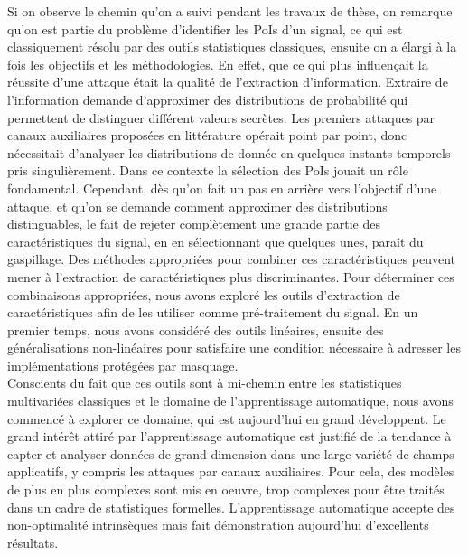 Si on observe le chemin qu'on a suivi pendant les travaux de th\`{e}se, on remarque qu'on est partie du probl\`{e}me d'identifier les PoIs d'un signal, ce qui est classiquement r\'{e}solu par des outils statistiques classiques, ensuite on a \'{e}largi \`{a} la fois les objectifs et les m\'{e}thodologies. En effet, que ce qui plus influençait la r\'{e}ussite d'une attaque \'{e}tait la qualit\'{e} de l'extraction d'information. Extraire de l'information demande d'approximer des distributions de probabilit\'{e} qui permettent de distinguer diff\'{e}rent valeurs secr\`{e}tes. Les premiers attaques par canaux auxiliaires propos\'{e}es en litt\'{e}rature op\'{e}rait point par point, donc n\'{e}cessitait d'analyser les distributions de donn\'{e}e en quelques instants temporels pris singuli\`{e}rement. Dans ce contexte la s\'{e}lection des PoIs jouait un r\^{o}le fondamental. Cependant, d\`{e}s qu'on fait un pas en arri\`{e}re vers l'objectif d'une attaque, et qu'on se demande comment approximer des distributions distinguables, le fait de rejeter compl\`{e}tement une grande partie des caract\'{e}ristiques du signal, en en s\'{e}lectionnant que quelques unes, paraît du gaspillage. Des m\'{e}thodes appropri\'{e}es pour combiner ces caract\'{e}ristiques peuvent mener \`{a} l'extraction de caract\'{e}ristiques plus discriminantes. Pour d\'{e}terminer ces combinaisons appropri\'{e}es, nous avons explor\'{e} les outils d'extraction de caract\'{e}ristiques afin de les utiliser comme pr\'{e}-traitement du signal. En un premier temps, nous avons consid\'{e}r\'{e} des outils lin\'{e}aires, ensuite des g\'{e}n\'{e}ralisations non-lin\'{e}aires pour satisfaire une condition n\'{e}cessaire \`{a} adresser les impl\'{e}mentations prot\'{e}g\'{e}es par masquage.\\ 

Conscients du fait que ces outils sont \`{a} mi-chemin entre les statistiques multivari\'{e}es classiques et le domaine de l'apprentissage automatique, nous avons commenc\'{e} \`{a} explorer ce domaine, qui est aujourd'hui en grand d\'{e}veloppent. Le grand int\'{e}rêt attir\'{e} par l'apprentissage automatique est justifi\'{e} de la tendance \`{a} capter et analyser donn\'{e}es de grand dimension dans une large vari\'{e}t\'{e} de champs applicatifs, y compris les attaques par canaux auxiliaires. Pour cela, des mod\`{e}les de plus en plus complexes sont mis en oeuvre, trop complexes pour être trait\'{e}s dans un cadre de statistiques formelles. L'apprentissage automatique accepte des non-optimalit\'{e} intrins\`{e}ques mais fait d\'{e}monstration aujourd'hui d'excellents r\'{e}sultats.  \\

